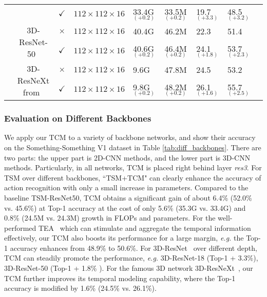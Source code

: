 \documentclass[journal]{IEEEtran}
\begin{document}
\begin{table*}[!ht]
\begin{tabular}{lccclllll}
                             &                & $\checkmark$ & $112\times112\times16$     & 33.4G$_{(+0.2)}$    & 33.5M$_{(+0.2)}$   &19.7$_{(+3.3)}$   & 48.5$_{(+3.2)}$    \\ \cline{2-8}
&\multirow{2}{*}{3D-ResNet-50~\cite{hara2018can}} &$\times$     & $112\times112\times16$    & 40.4G    & 46.2M    & 22.3       & 51.4                        \\
                             &                & $\checkmark$ & $112\times112\times16$     & 40.6G$_{(+0.2)}$    & 46.4M$_{(+0.2)}$   &24.1$_{(+1.8)}$   & 53.7$_{(+2.3)}$    \\ \cline{2-8}
&\multirow{2}{*}{3D-ResNeXt from~\cite{crasto2019mars}}  &$\times$     & $112\times112\times16$    & 9.6G    & 47.8M    & 24.5       & 53.2                        \\
                             &                & $\checkmark$ & $112\times112\times16$     & 9.8G$_{(+0.2)}$    & 48.2M$_{(+0.2)}$   &26.1$_{(+1.6)}$   & 55.7$_{(+2.5)}$    \\ \hline

\end{tabular}
\end{table*}

\subsubsection{Evaluation on Different Backbones} We apply our TCM to a variety of backbone networks, and show their accuracy on the Something-Something V1 dataset in Table \ref{tab:diff_backbones}. There are two parts: the upper part is 2D-CNN methods, and the lower part is 3D-CNN methods. Particularly, in all networks, TCM is placed right behind layer \textit{res3}. For TSM over different backbones, ``TSM+TCM" can clearly enhance the accuracy of action recognition with only a small increase in parameters. Compared to the baseline TSM-ResNet50, TCM obtains a significant gain of about 6.4\% (52.0\% vs. 45.6\%) at Top-1 accuracy at the cost of only 5.6\%  (35.3G vs. 33.4G) and 0.8\% (24.5M vs. 24.3M) growth in FLOPs and parameters. For the well-performed TEA~\cite{li2020tea} which can stimulate and aggregate the temporal information effectively, our TCM also boosts its performance for a large margin, \textit{e.g.} the Top-1 accuracy enhances from 48.9\% to 50.6\%. For 3D-ResNet~\cite{hara2018can} over different depth, TCM can steadily promote the performance, \textit{e.g.} 3D-ResNet-18 (Top-1 + 3.3\%), 3D-ResNet-50 (Top-1 + 1.8\% ). For the famous 3D network 3D-ResNeXt~\cite{crasto2019mars}, our TCM further improves its temporal modeling capability, where the Top-1 accuracy is modified by 1.6\% (24.5\% vs. 26.1\%).
\end{document}
